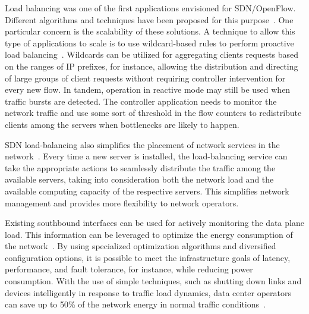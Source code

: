 Load balancing was one of the first applications envisioned for SDN/OpenFlow.
Different algorithms and techniques have been proposed for this purpose~\cite{wang2011,handigol2009,handigol2009-1}. 
One particular concern is the scalability of these solutions.
A technique to allow this type of applications to scale is to use wildcard-based rules to perform proactive load balancing~\cite{wang2011}.
Wildcards can be utilized for aggregating clients requests based on the ranges of IP prefixes, for instance, allowing the distribution and directing of large groups of client requests without requiring controller intervention for every new flow.
In tandem, operation in reactive mode may still be used when traffic bursts are detected.
The controller application needs to monitor the network traffic and use some sort of 
threshold in the flow counters to redistribute clients among the servers when bottlenecks are likely to happen.

SDN load-balancing also simplifies the placement of network services in the network~\cite{handigol2009-1}.
Every time a new server is installed, the load-balancing service can take the appropriate actions to seamlessly distribute the traffic among the 
available servers, taking into consideration both the network load and the available computing capacity of the respective servers.
This simplifies network management and provides more flexibility to network operators.

Existing southbound interfaces can be used for actively monitoring the data plane load.
This information can be leveraged to optimize the energy consumption of the network~\cite{heller2010}. 
By using specialized optimization algorithms and diversified configuration options, it is possible to meet the 
infrastructure goals of latency, performance, and fault tolerance, for instance, while reducing power consumption.
With the use of simple techniques, such as shutting down links and devices intelligently in response to traffic load dynamics, data center operators can save up to 50\% of the network energy in normal traffic 
conditions~\cite{heller2010}. 

